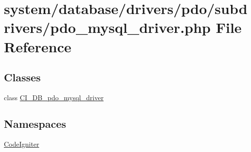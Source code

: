 \hypertarget{pdo__mysql__driver_8php}{}\section{system/database/drivers/pdo/subdrivers/pdo\+\_\+mysql\+\_\+driver.php File Reference}
\label{pdo__mysql__driver_8php}
\subsection*{Classes}
\begin{DoxyCompactItemize}
\item 
class \mbox{\hyperlink{class_c_i___d_b__pdo__mysql__driver}{C\+I\+\_\+\+D\+B\+\_\+pdo\+\_\+mysql\+\_\+driver}}
\end{DoxyCompactItemize}
\subsection*{Namespaces}
\begin{DoxyCompactItemize}
\item 
 \mbox{\hyperlink{namespace_code_igniter}{Code\+Igniter}}
\end{DoxyCompactItemize}
